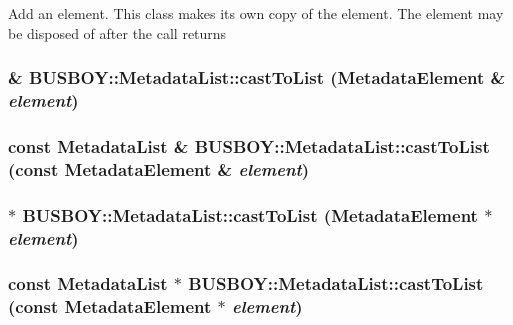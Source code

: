 Add an element. This class makes its own copy of the element. The element may be disposed of after the call returns \hypertarget{classBUSBOY_1_1MetadataList_a1b3f9d17f8ce5d35351bbe60e5369555}{
\subsubsection[{castToList}]{ \& BUSBOY::MetadataList::castToList ({\bf MetadataElement} \& {\em element})}}
\label{classBUSBOY_1_1MetadataList_a1b3f9d17f8ce5d35351bbe60e5369555}
\hypertarget{classBUSBOY_1_1MetadataList_abee1c415db2ff88c6e8ec03753c75b03}{
\subsubsection[{castToList}]{\setlength{\rightskip}{0pt plus 5cm}const {\bf MetadataList} \& BUSBOY::MetadataList::castToList (const {\bf MetadataElement} \& {\em element})}}
\label{classBUSBOY_1_1MetadataList_abee1c415db2ff88c6e8ec03753c75b03}
\hypertarget{classBUSBOY_1_1MetadataList_a071867b51cdd1db3b6f9a60aacfe91b7}{
\subsubsection[{castToList}]{ $\ast$ BUSBOY::MetadataList::castToList ({\bf MetadataElement} $\ast$ {\em element})}}
\label{classBUSBOY_1_1MetadataList_a071867b51cdd1db3b6f9a60aacfe91b7}
\hypertarget{classBUSBOY_1_1MetadataList_a629f4e7790528085ed62bf66e0bd82a3}{
\subsubsection[{castToList}]{\setlength{\rightskip}{0pt plus 5cm}const {\bf MetadataList} $\ast$ BUSBOY::MetadataList::castToList (const {\bf MetadataElement} $\ast$ {\em element})}}
